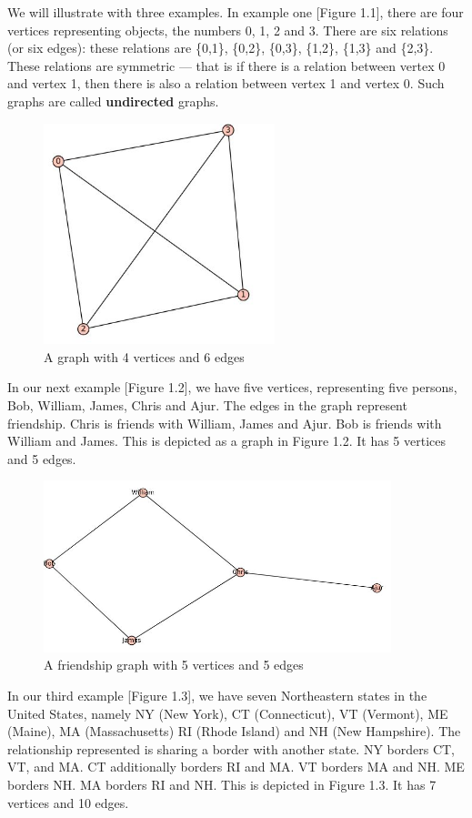 We will illustrate with three examples. In example one [Figure 1.1], there are four vertices representing objects, the numbers 0, 1, 2 and 3. There are six relations (or six edges): these relations are \{0,1\}, \{0,2\}, \{0,3\}, \{1,2\}, \{1,3\} and \{2,3\}. These relations are symmetric --- that is if there is a relation between vertex 0 and vertex 1, then there is also a relation between vertex 1 and vertex 0. Such graphs are called \textbf{undirected} graphs.
\begin{figure}
\includegraphics[width=0.6\textwidth]{example.JPG}
\caption{A graph with 4 vertices and 6 edges}
\end{figure}
\begin{newpage}
\end{newpage}

In our next example [Figure 1.2], we have five vertices, representing five persons, Bob, William, James, Chris and Ajur. The edges in the graph represent friendship. Chris is friends with William, James and Ajur. Bob is friends with William and James. This is depicted as a graph in Figure 1.2. It has 5 vertices and 5 edges.
\begin{figure}
\includegraphics[width=0.9\textwidth]{example2.JPG}
\caption{A friendship graph with 5 vertices and 5 edges}
\end{figure}
\begin{newpage}
\end{newpage}
In our third example [Figure 1.3], we have seven Northeastern states in the United States, namely NY (New York), CT (Connecticut), VT (Vermont), ME (Maine), MA (Massachusetts) RI (Rhode Island) and NH (New Hampshire). The relationship represented is sharing a border with another state. NY borders CT, VT, and MA. CT additionally borders RI and MA. VT borders MA and NH. ME borders NH. MA borders RI and NH. This is depicted in Figure 1.3. It has 7 vertices and 10 edges.


